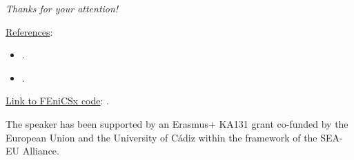 \begin{frame}{}
    \small
	\vspace*{0.4cm}
  \begin{center}
	{\Huge
		\emph{Thanks for your attention!}}
  \end{center}
	
	\vspace*{0.3cm}

\underline{References}:
\begin{itemize}
    \item {}.
    \item {}.
    
\end{itemize}

\vspace*{0.3cm}

  \underline{Link to FEniCSx code}: .

  \vspace*{0.3cm}

	\begin{acknowledgements}
		The speaker has been supported by an Erasmus+ KA131 grant co-funded by the European Union and the University of Cádiz within the framework of the SEA-EU Alliance.
	\end{acknowledgements}
\end{frame}